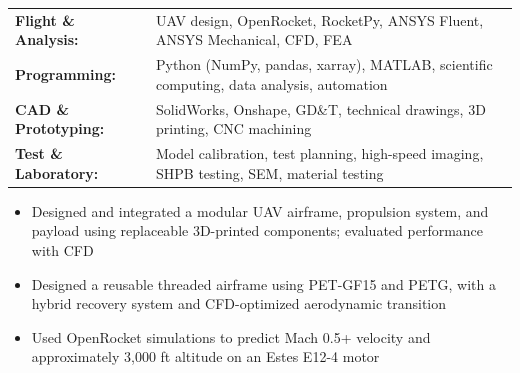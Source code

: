 \documentclass[10pt,letterpaper]{article}
\begin{document}
\vspace{2pt}
\researchEntry

\begin{tabularx}{\textwidth}{@{}>{\bfseries}l X@{}}
Flight \& Analysis: & UAV design, OpenRocket, RocketPy, ANSYS Fluent, ANSYS Mechanical, CFD, FEA \\
Programming: & Python (NumPy, pandas, xarray), MATLAB, scientific computing, data analysis, automation \\
CAD \& Prototyping: & SolidWorks, Onshape, GD\&T, technical drawings, 3D printing, CNC machining \\
Test \& Laboratory: & Model calibration, test planning, high-speed imaging, SHPB testing, SEM, material testing
\end{tabularx}

\begin{itemize}
  \item Designed and integrated a modular UAV airframe, propulsion system, and payload using replaceable 3D-printed components; evaluated performance with CFD
\end{itemize}
\begin{itemize}
  \item Designed a reusable threaded airframe using PET-GF15 and PETG, with a hybrid recovery system and CFD-optimized aerodynamic transition
  \item Used OpenRocket simulations to predict Mach 0.5+ velocity and approximately 3,000 ft altitude on an Estes E12-4 motor
\end{itemize}
\end{document}
